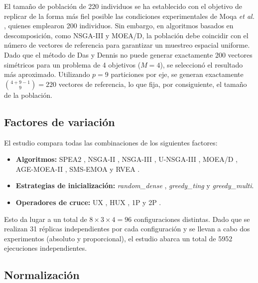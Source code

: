 El tamaño de población de 220 individuos se ha establecido con el objetivo de replicar de la forma más fiel posible las condiciones experimentales de Moqa \textit{et al.} \cite{moqa2022assessing}, quienes emplearon 200 individuos. Sin embargo, en algoritmos basados en descomposición, como NSGA-III \cite{deb2013evolutionary} y MOEA/D, la población debe coincidir con el número de vectores de referencia para garantizar un muestreo espacial uniforme. Dado que el método de Das y Dennis \cite{das1998normal} no puede generar exactamente 200 vectores simétricos para un problema de 4 objetivos ($M=4$), se seleccionó el resultado más aproximado. Utilizando $p=9$ particiones por eje, se generan exactamente $\binom{4+9-1}{9} = 220$ vectores de referencia, lo que fija, por consiguiente, el tamaño de la población.

\subsection{Factores de variación}

El estudio compara todas las combinaciones de los siguientes factores:

\begin{itemize}
    \item \textbf{Algoritmos:} SPEA2 \cite{zitzler2001spea2}, NSGA-II \cite{deb2002fast}, NSGA-III \cite{deb2013evolutionary}, U-NSGA-III \cite{seada2015unified}, MOEA/D \cite{zhang2007moea}, AGE-MOEA-II \cite{panichella2022adaptive}, SMS-EMOA \cite{beume2007sms} y RVEA \cite{cheng2016reference}.
    \item \textbf{Estrategias de inicialización:} \textit{random\_dense} \cite{ting2010multi}, \textit{greedy\_ting} \cite{ting2010multi} y \textit{greedy\_multi}.
    \item \textbf{Operadores de cruce:} UX \cite{syswerda1989uniform}, HUX \cite{eshelman1991chc}, 1P y 2P \cite{holland1975adaptation}.
\end{itemize}

Esto da lugar a un total de $8 \times 3 \times 4 = 96$ configuraciones distintas. Dado que se realizan 31 réplicas independientes \cite{granado2020multiobjective} por cada configuración y se llevan a cabo dos experimentos (absoluto y proporcional), el estudio abarca un total de 5952 ejecuciones independientes.

\subsection{Normalización}


